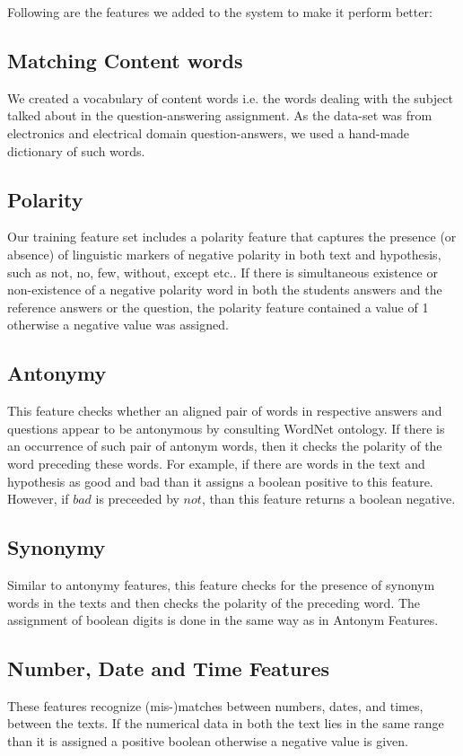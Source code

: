 \documentclass[a4paper]{article}
\begin{document}
Following are the features we added to the system to make it perform better:\\
\subsection{Matching Content words}We created a vocabulary of content words i.e. the words dealing with the subject talked about in the question-answering assignment. As the data-set was from electronics and electrical domain question-answers, we used a hand-made dictionary of such words.

\subsection{Polarity} 
Our training feature set includes a polarity feature that captures the presence (or absence) of linguistic markers of negative polarity in both text and hypothesis, such as not, no, few, without, except etc.. If there is simultaneous existence or non-existence of a negative polarity word in both the students answers and the reference answers or the question, the polarity feature contained a value of 1 otherwise a negative value was assigned.
\subsection{Antonymy}
This feature checks whether an aligned pair of words in respective answers and questions appear to be antonymous by consulting WordNet ontology\cite{wordnet}. If there is an occurrence of such pair of antonym words, then it checks the polarity of the word preceding these words. For example, if there are words in the text and hypothesis as good and bad than it assigns a boolean positive  to this feature. However, if $bad$ is preceeded by $not$, than this feature returns a boolean negative. 
\subsection{Synonymy}
Similar to antonymy features, this feature checks for the presence of synonym words in the texts and then checks the polarity of the preceding word. The assignment of boolean digits is done in the same way as in Antonym Features.
\subsection{Number, Date and Time Features}
These features recognize (mis-)matches between numbers, dates, and times, between the texts. If the numerical data in both the text lies in the same range than it is assigned a positive boolean otherwise a negative value is given.
\end{document}
